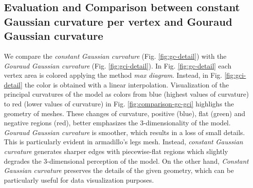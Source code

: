 \subsection{Evaluation and Comparison between constant Gaussian curvature per vertex and Gouraud Gaussian curvature}
We compare the \textit{constant Gaussian curvature} (Fig. \ref{fig:gc-detail}) with the \textit{Gouraud Gaussian curvature} (Fig. \ref{fig:gci-detail}).
In Fig. \ref{fig:gc-detail} each vertex area is colored applying the method \textit{max diagram}. Instead, in Fig. \ref{fig:gci-detail} the color is obtained with a linear interpolation.
Visualization of the principal curvatures of the model as colors from blue (highest values of curvature) to red (lower values of curvature) in Fig. \ref{fig:comparison-gc-gci} highlighs the geometry of meshes.
These changes of curvature, positive (blue), flat (green) and negative regions (red), better emphasizes the 3-dimensionality of the model.
\textit{Gouraud Gaussian curvature} is smoother, which results in a loss of small details. This is particularly evident in armadillo's legs mesh. Instead, \textit{constant Gaussian curvature} generates sharper edges with piecewise-flat regions which slightly degrades the 3-dimensional perception of the model.
On the other hand, \textit{Constant Gaussian curvature} preserves the details of the given geometry, which can be particularly useful for data visualization purposes.

